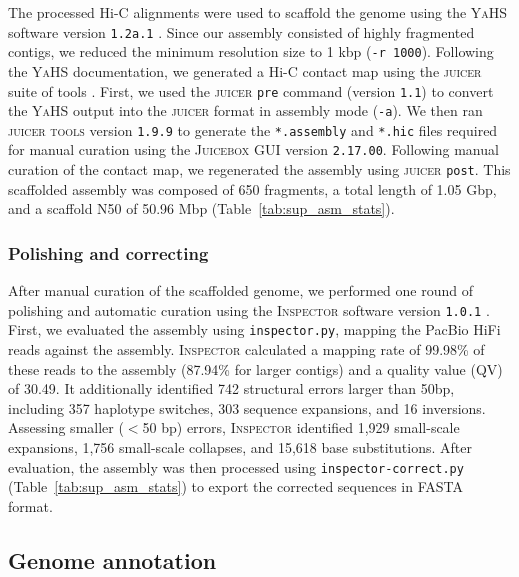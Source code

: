 \documentclass[11pt]{article}
\begin{document}
The processed Hi-C alignments were used to scaffold the genome using the \textsc{YaHS}
software version \texttt{1.2a.1} \citep{zhou_yahs_2023}. Since our assembly consisted of
highly fragmented contigs, we reduced the minimum resolution size to 1 kbp (\texttt{-r
1000}). Following the \textsc{YaHS} documentation, we generated a Hi-C contact map
using the \textsc{juicer} suite of tools \citep{durand_juicer_2016,dudchenko_juicebox_2018}.
First, we used the \textsc{juicer} \texttt{pre} command (version \texttt{1.1}) to
convert the \textsc{YaHS} output into the \textsc{juicer} format in assembly mode
(\texttt{-a}). We then ran \textsc{juicer tools} version \texttt{1.9.9} to generate
the \texttt{*.assembly} and \texttt{*.hic} files required for manual curation using
the \textsc{Juicebox} GUI version \texttt{2.17.00}. Following manual curation of
the contact map, we regenerated the assembly using \textsc{juicer} \texttt{post}. This
scaffolded assembly was composed of 650 fragments, a total length of 1.05 Gbp, and
a scaffold N50 of 50.96 Mbp (Table~\ref{tab:sup_asm_stats}).

\subsubsection*{Polishing and correcting}

After manual curation of the scaffolded genome, we performed one round of polishing and
automatic curation using the \textsc{Inspector} software version \texttt{1.0.1}
\citep{chen_accurate_2021}. First, we evaluated the assembly using \texttt{inspector.py},
mapping the PacBio HiFi reads against the assembly.
\textsc{Inspector} calculated a mapping rate of 99.98\% of these reads to the assembly
(87.94\% for larger contigs) and a quality value (QV) of 30.49.
It additionally identified 742 structural errors larger than 50bp, including
357 haplotype switches, 303 sequence expansions, and 16 inversions.
Assessing smaller ($<$50 bp) errors, \textsc{Inspector} identified 1,929 small-scale
expansions, 1,756 small-scale collapses, and 15,618 base substitutions.
After evaluation, the assembly was then processed using \texttt{inspector-correct.py}
(Table~\ref{tab:sup_asm_stats}) to export the corrected sequences in FASTA format.

\subsection*{Genome annotation}\label{sec:methods_annotation}
\end{document}
